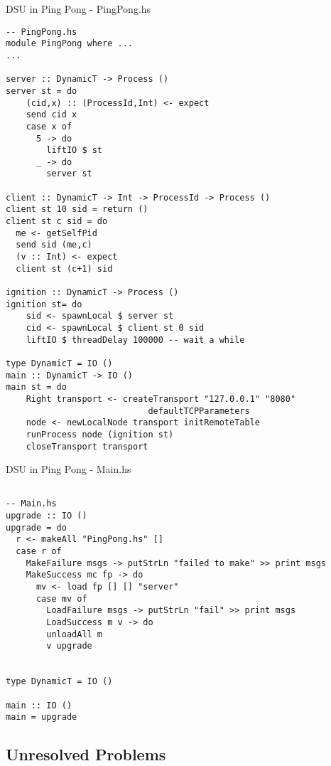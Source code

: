 \begin{program}
\caption[DSU in Ping Pong - PingPong.hs]
{DSU in Ping Pong - PingPong.hs}
\label{fig:dsu1}
\begin{verbatim}
-- PingPong.hs
module PingPong where ...
...

server :: DynamicT -> Process ()
server st = do
    (cid,x) :: (ProcessId,Int) <- expect
    send cid x
    case x of
      5 -> do
        liftIO $ st
      _ -> do
        server st

client :: DynamicT -> Int -> ProcessId -> Process ()
client st 10 sid = return ()
client st c sid = do
  me <- getSelfPid
  send sid (me,c)
  (v :: Int) <- expect
  client st (c+1) sid

ignition :: DynamicT -> Process ()
ignition st= do
    sid <- spawnLocal $ server st
    cid <- spawnLocal $ client st 0 sid
    liftIO $ threadDelay 100000 -- wait a while

type DynamicT = IO ()
main :: DynamicT -> IO ()
main st = do
    Right transport <- createTransport "127.0.0.1" "8080"
                            defaultTCPParameters
    node <- newLocalNode transport initRemoteTable
    runProcess node (ignition st)
    closeTransport transport

\end{verbatim}
\end{program}

\begin{program}
\caption[DSU in Ping Pong - Main.hs]
{DSU in Ping Pong - Main.hs}
\label{fig:dsu2}
\begin{verbatim}

-- Main.hs
upgrade :: IO ()
upgrade = do
  r <- makeAll "PingPong.hs" []
  case r of
    MakeFailure msgs -> putStrLn "failed to make" >> print msgs
    MakeSuccess mc fp -> do
      mv <- load fp [] [] "server"
      case mv of
        LoadFailure msgs -> putStrLn "fail" >> print msgs
        LoadSuccess m v -> do
        unloadAll m
        v upgrade


type DynamicT = IO ()

main :: IO ()
main = upgrade

\end{verbatim}
\end{program}

\subsection{Unresolved Problems}
\label{sec:unresolved}

